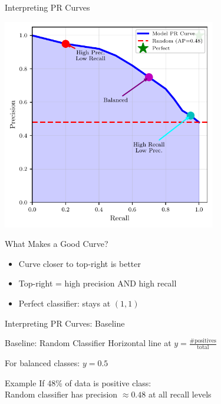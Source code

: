 \documentclass{beamer}
\begin{document}
\begin{frame}{Interpreting PR Curves}
\begin{center}
\includegraphics[width=0.7\textwidth]{pr-curve-diagram.pdf}
\end{center}

\vspace{0.15cm}

\begin{keypointsbox}{What Makes a Good Curve?}
\small
\begin{itemize}
    \item Curve closer to top-right is better
    \item Top-right = high precision AND high recall
    \item Perfect classifier: stays at $(1, 1)$
\end{itemize}
\end{keypointsbox}
\end{frame}

\begin{frame}{Interpreting PR Curves: Baseline}
\begin{block}{Baseline: Random Classifier}
Horizontal line at $y = \frac{\text{\# positives}}{\text{total}}$

\vspace{0.15cm}

For balanced classes: $y = 0.5$
\end{block}

\vspace{0.2cm}

\begin{examplebox}{Example}
\small
If 48\% of data is positive class: \\
Random classifier has precision $\approx 0.48$ at all recall levels
\end{examplebox}
\end{frame}
\end{document}
